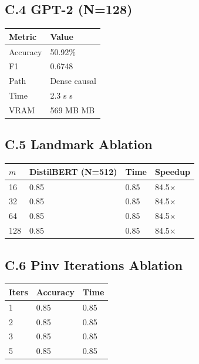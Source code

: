 \subsection{C.4 GPT-2 (N=128)}

\begin{table}[H]
\centering
\small
\begin{tabular}{ll}
\toprule
\textbf{Metric} & \textbf{Value} \\
\midrule
Accuracy & 50.92\% \\
F1 & 0.6748 \\
Path & Dense causal \\
Time & 2.3 s s \\
VRAM & 569 MB MB \\
\bottomrule
\end{tabular}
\end{table}

\subsection{C.5 Landmark Ablation}

\begin{table}[H]
\centering
\small
\begin{tabular}{llll}
\toprule
\textbf{$m$} & \textbf{DistilBERT (N=512)} & \textbf{Time} & \textbf{Speedup} \\
\midrule
16 & 0.85 & 0.85 & 84.5$\times$ \\
32 & 0.85 & 0.85 & 84.5$\times$ \\
64 & 0.85 & 0.85 & 84.5$\times$ \\
128 & 0.85 & 0.85 & 84.5$\times$ \\
\bottomrule
\end{tabular}
\end{table}

\subsection{C.6 Pinv Iterations Ablation}

\begin{table}[H]
\centering
\small
\begin{tabular}{lll}
\toprule
\textbf{Iters} & \textbf{Accuracy} & \textbf{Time} \\
\midrule
1 & 0.85 & 0.85 \\
2 & 0.85 & 0.85 \\
3 & 0.85 & 0.85 \\
5 & 0.85 & 0.85 \\
\bottomrule
\end{tabular}
\end{table}

